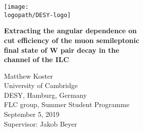 \begin{titlepage}

  \begin{center}
    \texttt{[image: \\logopath/DESY-logo]}
  \end{center}

  \vspace{0em}

  \begin{minipage}[t]{\textwidth}

    \begin{minipage}{\linewidth}

      \vspace{0em}

      \begin{center}\bfseries\huge
        Extracting the angular dependence on \\
        cut efficiency of the muon semileptonic \\
        final state of W pair decay in the \\
         channel of the ILC
      \end{center}

      \vspace{1.0 em}

      \begin{center}\large
        Matthew Koster\\
        University of Cambridge\\
        DESY, Hamburg, Germany\\
        FLC group, Summer Student Programme\\[0.5cm]
        September 5, 2019\\[0.5cm]
        Supervisor: Jakob Beyer
      \end{center}

    \end{minipage}
  \end{minipage}

  \vspace{1cm}

  \begin{abstract}
    
  \end{abstract}

\end{titlepage}
